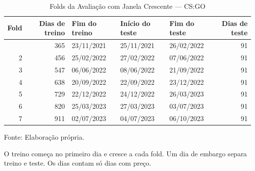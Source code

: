 \begin{table}[H]
\caption{Folds da Avaliação com Janela Crescente — CS:GO}\label{tab:walk_forward} 

\fontsize{12.0pt}{14.4pt}\selectfont

\begin{tabular*}{\linewidth}{@{\extracolsep{\fill}}rrlllr}
\toprule
\textbf{Fold} & \textbf{Dias de treino} & \textbf{Fim do treino} & \textbf{Início do teste} & \textbf{Fim do teste} & \textbf{Dias de teste} \\
\midrule\addlinespace[2.5pt]
1 & 365 & 23/11/2021 & 25/11/2021 & 26/02/2022 & 91 \\
2 & 456 & 25/02/2022 & 27/02/2022 & 07/06/2022 & 91 \\
3 & 547 & 06/06/2022 & 08/06/2022 & 21/09/2022 & 91 \\
4 & 638 & 20/09/2022 & 22/09/2022 & 23/12/2022 & 91 \\
5 & 729 & 22/12/2022 & 24/12/2022 & 26/03/2023 & 91 \\
6 & 820 & 25/03/2023 & 27/03/2023 & 03/07/2023 & 91 \\
7 & 911 & 02/07/2023 & 04/07/2023 & 06/10/2023 & 91 \\
\bottomrule
\end{tabular*}
\par\vspace{\belowcaptionskip}\footnotesize Fonte: Elaboração própria.\par
\begin{minipage}{\linewidth}
O treino começa no primeiro dia e cresce a cada fold. Um dia de embargo separa treino e teste. Os dias contam só dias com preço.\\
\end{minipage}
\end{table}
